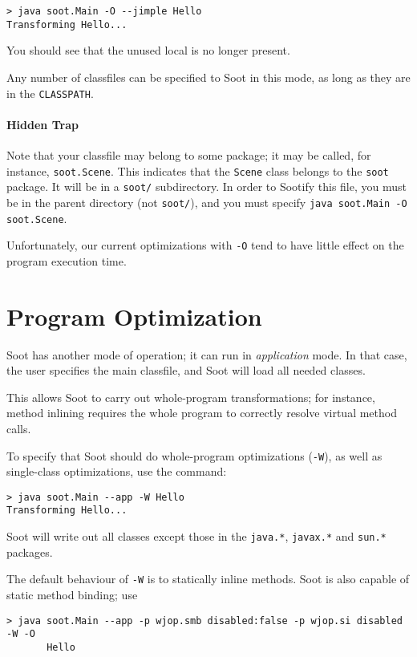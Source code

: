 \documentclass{article}
\begin{document}
\begin{verbatim}
> java soot.Main -O --jimple Hello
Transforming Hello...
\end{verbatim}

You should see that the unused local is no longer present.

Any number of classfiles can be specified to Soot in this mode, as
long as they are in the {\tt CLASSPATH}.

\paragraph{Hidden Trap} Note that your classfile may belong to some
package; it may be called, for instance, {\tt soot.Scene}.  This
indicates that the {\tt Scene} class belongs to the {\tt soot} package.
It will be in a {\tt soot/} subdirectory.  In order to Sootify this
file, you must be in the parent directory (not {\tt soot/}), and you
must specify {\tt java soot.Main -O soot.Scene}.

Unfortunately, our current optimizations with {\tt -O} tend to have
little effect on the program execution time.

\section{Program Optimization}

Soot has another mode of operation; it can run in {\em application} mode.
In that case, the user specifies the main classfile, and Soot will load
all needed classes.  

This allows Soot to carry out whole-program transformations; for
instance, method inlining requires the whole program
to correctly resolve virtual method calls.

To specify that Soot should do whole-program optimizations ({\tt -W}),
as well as single-class optimizations, use the command:

\begin{verbatim}
> java soot.Main --app -W Hello
Transforming Hello...
\end{verbatim}

Soot will write out all classes except those in the {\tt java.*},
{\tt javax.*} and {\tt sun.*} packages.

The default behaviour of {\tt -W} is to statically inline methods.
Soot is also capable of static method binding; use 

\begin{verbatim}
> java soot.Main --app -p wjop.smb disabled:false -p wjop.si disabled -W -O
       Hello
\end{verbatim}
\end{document}
